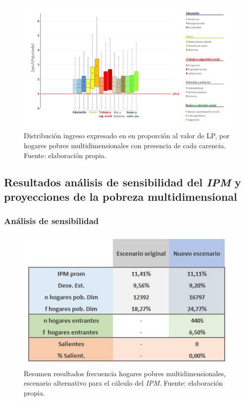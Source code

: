 \documentclass[12pt,letterpaper,spanish]{article}
\begin{document}
\begin{figure}[!]
    \centering
    \includegraphics[width=\textwidth]{Max/box_carencias.png}
    \caption{Distribución ingreso expresado en en proporción al valor de LP, por hogares pobres multidimensionales con presencia de cada carencia. Fuente: elaboración propia.}
    \label{box_carencias}
\end{figure}

\subsection{Resultados análisis de sensibilidad del \textit{IPM} y proyecciones de la pobreza multidimensional}


\subsubsection{Análisis de sensibilidad}




\begin{figure}[H]
    \centering
        \includegraphics[width=11cm]{Max/estadistica_escenario.png}
    \caption{Resumen resultados frecuencia hogares pobres multidimensionales, escenario alternativo para el cálculo del \textit{IPM}. Fuente: elaboración propia.}
    \label{resusensible}
\end{figure}
\end{document}
